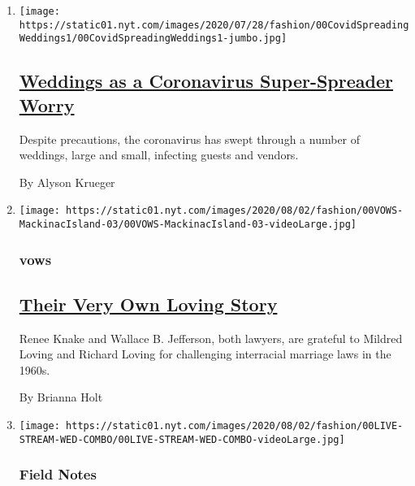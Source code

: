 \begin{enumerate}
\def\labelenumi{\arabic{enumi}.}
\item
  \texttt{[image: https://static01.nyt.com/images/2020/07/28/fashion/00CovidSpreadingWeddings1/00CovidSpreadingWeddings1-jumbo.jpg]}

  \hypertarget{weddings-as-a-coronavirus-super-spreader-worry}{%
  \subsection{\texorpdfstring{\href{/2020/08/04/fashion/weddings/weddings-as-covid-super-spreaders.html}{Weddings
  as a Coronavirus Super-Spreader
  Worry}}{Weddings as a Coronavirus Super-Spreader Worry}}\label{weddings-as-a-coronavirus-super-spreader-worry}}

  Despite precautions, the coronavirus has swept through a number of
  weddings, large and small, infecting guests and vendors.

  By Alyson Krueger
\item
  \texttt{[image: https://static01.nyt.com/images/2020/08/02/fashion/00VOWS-MackinacIsland-03/00VOWS-MackinacIsland-03-videoLarge.jpg]}

  \hypertarget{vows}{%
  \subsubsection{vows}\label{vows}}

  \hypertarget{their-very-own-loving-story}{%
  \subsection{\texorpdfstring{\href{/2020/07/31/fashion/weddings/Renee-Knake-and-Wallace-Jefferson-wed-tribute-to-Lovings-before-them.html}{Their
  Very Own Loving
  Story}}{Their Very Own Loving Story}}\label{their-very-own-loving-story}}

  Renee Knake and Wallace B. Jefferson, both lawyers, are grateful to
  Mildred Loving and Richard Loving for challenging interracial marriage
  laws in the 1960s.

  By Brianna Holt
\item
  \texttt{[image: https://static01.nyt.com/images/2020/08/02/fashion/00LIVE-STREAM-WED-COMBO/00LIVE-STREAM-WED-COMBO-videoLarge.jpg]}

  \hypertarget{field-notes}{%
  \subsubsection{Field Notes}\label{field-notes}}


\end{enumerate}
